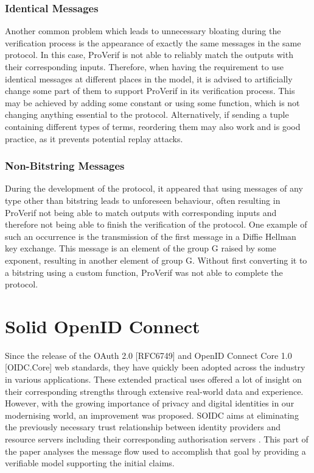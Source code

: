 \documentclass[11pt,twoside,a4paper,openright]{book}
\begin{document}
\subsection{Identical Messages}

Another common problem which leads to unnecessary bloating during the verification process is the appearance of exactly the same messages in the same protocol. In this case, ProVerif is not able to reliably match the outputs with their corresponding inputs. Therefore, when having the requirement to use identical messages at different places in the model, it is advised to artificially change some part of them to support ProVerif in its verification process. This may be achieved by adding some constant or using some function, which is not changing anything essential to the protocol. Alternatively, if sending a tuple containing different types of terms, reordering them may also work and is good practice, as it prevents potential replay attacks.

\subsection{Non-Bitstring Messages}

During the development of the protocol, it appeared that using messages of any type other than bitstring leads to unforeseen behaviour, often resulting in ProVerif not being able to match outputs with corresponding inputs and therefore not being able to finish the verification of the protocol. One example of such an occurrence is the transmission of the first message in a Diffie Hellman key exchange. This message is an element of the group G raised by some exponent, resulting in another element of group G. Without first converting it to a bitstring using a custom function, ProVerif was not able to complete the protocol.


\chapter{Solid OpenID Connect}
\label{soidc}

Since the release of the OAuth 2.0 [RFC6749] and OpenID Connect Core 1.0 [OIDC.Core] web standards, they have quickly been adopted across the industry in various applications. These extended practical uses offered a lot of insight on their corresponding strengths through extensive real-world data and experience. However, with the growing importance of privacy and digital identities in our modernising world, an improvement was proposed. SOIDC aims at eliminating the previously necessary trust relationship between identity providers and resource servers including their corresponding authorisation servers \cite{solid}. This part of the paper analyses the message flow used to accomplish that goal by providing a verifiable model supporting the initial claims.
\end{document}
